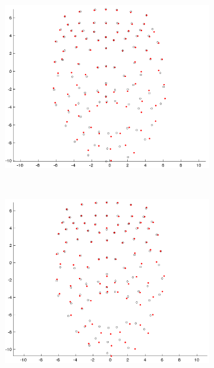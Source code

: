 \begin{figure}[htbp!]
        \centering
        \begin{subfigure}[b]{0.3\textwidth}
                \includegraphics[width=\textwidth]{img/weights/3D/w2/w2_frame200_blends68.png}
        \end{subfigure}%
        ~ %
        \begin{subfigure}[b]{0.3\textwidth}
                \includegraphics[width=\textwidth]{img/weights/3D/w2/w2_frame400_blends68.png}

\end{subfigure}
\end{figure}
